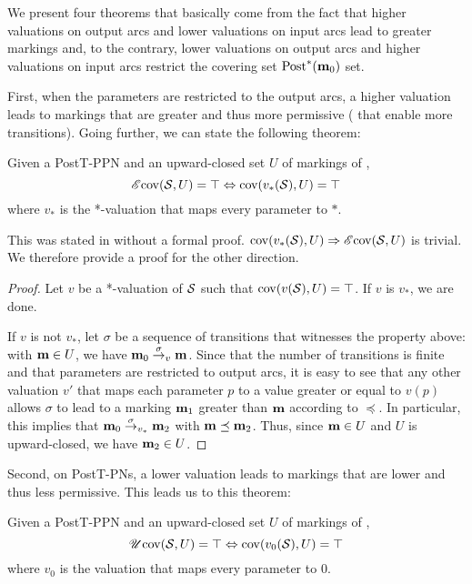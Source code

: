 We present four theorems that basically come from the fact that
higher valuations on output arcs and lower valuations on input arcs lead to greater markings and, to the contrary,
lower valuations on output arcs and higher valuations on input arcs restrict the covering set $\operatorname{Post}^*(\mathbf{m}_0)$ set.

First, when the parameters are restricted to the output arcs, a higher valuation leads to markings that are greater and thus more permissive ( that enable more transitions).
Going further, we can state the following theorem:
\begin{theo}
  \label{theo:post-e-star-val}
  Given a PostT-\ac{PPN} \SPTPm and an upward-closed set $U$ of markings of \PPN, \[\operatorname{\mathscr{E}cov}(\mathcal{S}, U) = \top \Leftrightarrow \operatorname{cov}(v_*(\mathcal{S}), U) = \top\] where $v_*$ is the *-valuation that maps every parameter to $*$.
\end{theo}

This was stated in \cite{David17} without a formal proof.
$\operatorname{cov}(v_*(\mathcal{S}), U) \Rightarrow \operatorname{\mathscr{E}cov}(\mathcal{S}, U)$ is trivial.
We therefore provide a proof for the other direction.


\begin{proof}
  Let $v$ be a *-valuation of $\mathcal{S}$ such that $\operatorname{cov}(v(\mathcal{S}), U) = \top$.
  If $v$ is $v_*$, we are done.

  If $v$ is not $v_*$, let $\sigma$ be a sequence of transitions that witnesses the property above: with $\mathbf{m} \in U$, we have $\mathbf{m}_0 \stackrel{\sigma}{\to}_v \mathbf{m}$.
  Since that the number of transitions is finite and that parameters are restricted to output arcs, it is easy to see that any other valuation $v'$ that maps each parameter $p$ to a value greater or equal to $v(p)$ allows $\sigma$ to lead to a marking $\mathbf{m}_1$ greater than $\mathbf{m}$ according to $\preceq$.
  In particular, this implies that $\mathbf{m}_0 \stackrel{\sigma}{\to}_{v_*} \mathbf{m}_2$ with $\mathbf{m} \preceq \mathbf{m}_2$.
  Thus, since $\mathbf{m} \in U$ and $U$ is upward-closed, we have $\mathbf{m}_2 \in U$.
\end{proof}

Second, on PostT-\acp{PN}, a lower valuation leads to markings that are lower and thus less permissive.
This leads us to this theorem:
\begin{theo}
  \label{theo:post-u-zero-val}
  Given a PostT-\ac{PPN} \SPTPm and an upward-closed set $U$ of markings of \PPN, \[\operatorname{\mathscr{U}cov}(\mathcal{S}, U) = \top \Leftrightarrow \operatorname{cov}(v_0(\mathcal{S}), U) = \top\] where $v_0$ is the valuation that maps every parameter to $0$.
\end{theo}

